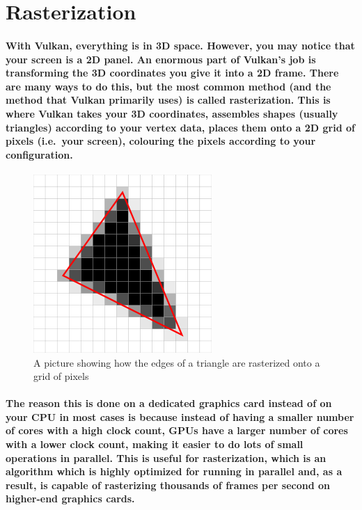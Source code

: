 \newpage
\section{Rasterization}\label{rasterization}

\paragraph{
With Vulkan, everything is in 3D space. However, you may notice that your screen is a 2D panel. An enormous part of Vulkan's job is transforming the 3D coordinates you give it into a 2D frame. There are many ways to do this, but the most common method (and the method that Vulkan primarily uses) is called rasterization. This is where Vulkan takes your 3D coordinates, assembles shapes (usually triangles) according to your vertex data, places them onto a 2D grid of pixels (i.e.~your screen), colouring the pixels according to your
configuration.
}

\begin{frame}{}
    \begin{figure}[ht]
        \centering
        \includegraphics{images/chap1/rasterization.png}
        \caption{A picture showing how the edges of a triangle are rasterized
        onto a grid of pixels}
    \end{figure}
\end{frame}
\paragraph{
The reason this is done on a dedicated graphics card instead of on your CPU in most cases is because instead of having a smaller number of cores with a high clock count, GPUs have a larger number of cores with a lower clock count, making it easier to do lots of small operations in parallel. This is useful for rasterization, which is an algorithm which is highly optimized for running in parallel and, as a result, is capable of rasterizing thousands of frames per second on higher-end graphics cards.
}